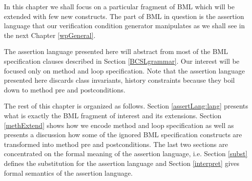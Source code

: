 In this chapter we shall focus on 
 a particular fragment of BML which will be extended with 
few new constructs.  The part of BML in question  
is the assertion language that our  verification condition generator manipulates
 as we shall see in the next Chapter \ref{wpGeneral}.



The assertion language presented here will abstract from most of the BML specification clauses described in Section \ref{BCSLgrammar}.
Our interest will be focused only on method and loop specification.
Note that  the assertion language presented here discards class invariants,
 history constraints  because  they boil down to method pre and postconditions. 


The rest of this chapter is organized as follows. Section \ref{assertLang:lang} presents
what is exactly the BML fragment of interest and its extensions.
Section \ref{methExtend} shows how we encode method and loop specification as well as presents a discussion
how some of the ignored BML specification constructs are transformed into method pre and postconditions.
The last two sections are concentrated on the formal meaning of the assertion language, i.e.
Section \ref{subst} defines the substitution for the assertion language and 
 Section \ref{interpret} gives formal semantics of the assertion language.

